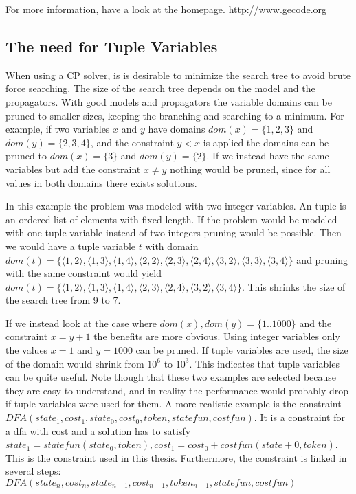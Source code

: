 \documentclass[a4paper,11pt]{article}
\begin{document}
For more information, have a look at the homepage. \url{http://www.gecode.org}

\subsection{The need for Tuple Variables}
When using a CP solver, is is desirable to minimize the search tree to avoid brute force searching. The size of the search tree depends on the model and the propagators. With good models and propagators the variable domains can be pruned to smaller sizes, keeping the branching and searching to a minimum. For example, if two variables $x$ and $y$ have domains $dom(x)=\{1,2,3\}$ and $dom(y)=\{2,3,4\}$, and the constraint $y<x$ is applied the domains can be pruned to $dom(x)=\{3\}$ and $dom(y)=\{2\}$. If we instead have the same variables but add the constraint $x\neq y$ nothing would be pruned, since for all values in both domains there exists solutions. 

In this example the problem was modeled with two integer variables. An tuple is an ordered list of elements with fixed length. If the problem would be modeled with one tuple variable instead of two integers pruning would be possible. Then we would have a tuple variable $t$ with domain $dom(t)=\{\langle1,2\rangle,\langle1,3\rangle,\langle1,4\rangle,\langle2,2\rangle,\langle2,3\rangle,\langle2,4\rangle,\langle3,2\rangle,\langle3,3\rangle,\langle3,4\rangle\}$ and pruning with the same constraint would yield $dom(t)=\{\langle1,2\rangle,\langle1,3\rangle,\langle1,4\rangle,\langle2,3\rangle,\langle2,4\rangle,\langle3,2\rangle,\langle3,4\rangle\}$. This shrinks the size of the search tree from 9 to 7. 

If we instead look at the case where $dom(x),dom(y)=\{1..1000\}$ and the constraint $x=y+1$ the benefits are more obvious. Using integer variables only the values $x=1$ and $y=1000$ can be pruned. If tuple variables are used, the size of the domain would shrink from $10^6$ to $10^3$. This indicates that tuple variables can be quite useful. Note though that these two examples are selected because they are easy to understand, and in reality the performance would probably drop if tuple variables were used for them. A more realistic example is the constraint $DFA(state_1, cost_1, state_0, cost_0, token, statefun, costfun)$. It is a constraint for a dfa with cost and a solution has to satisfy $state_1= statefun(state_0, token), cost_1=cost_0+costfun(state+0, token)$. This is the constraint used in this thesis. Furthermore, the constraint is linked in several steps: $DFA(state_n, cost_n, state_{n-1}, cost_{n-1}, token_{n-1}, statefun, costfun)$
\end{document}
